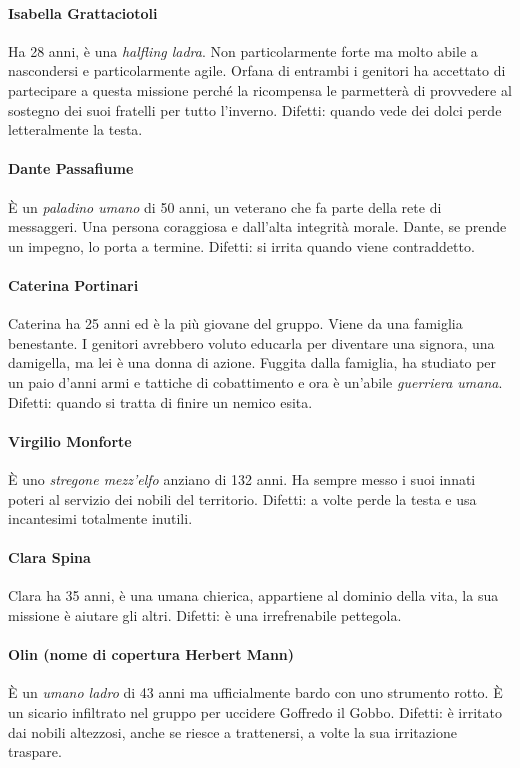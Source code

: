 \documentclass[letterpaper,twocolumn,openany,nodeprecatedcode]{dndbook}
\begin{document}
\paragraph{Isabella Grattaciotoli} Ha 28 anni, è una \textit{halfling ladra}. Non particolarmente forte ma molto abile a nascondersi e particolarmente agile. Orfana di entrambi i genitori ha accettato di partecipare a questa missione perché la ricompensa le parmetterà di provvedere al sostegno dei suoi fratelli per tutto l'inverno. Difetti: quando vede dei dolci perde letteralmente la testa.

\paragraph{Dante Passafiume} È un \textit{paladino umano} di 50 anni, un veterano che fa parte della rete di messaggeri. Una persona coraggiosa e dall'alta integrità morale. Dante, se prende un impegno, lo porta a termine. Difetti: si irrita quando viene contraddetto.

\paragraph{Caterina Portinari} Caterina ha 25 anni ed è la più giovane del gruppo. Viene da una famiglia benestante. I genitori avrebbero voluto educarla per diventare una signora, una damigella, ma lei è una donna di azione. Fuggita dalla famiglia, ha studiato per un paio d'anni armi e tattiche di cobattimento e ora è un'abile \textit{guerriera umana}. Difetti: quando si tratta di finire un nemico esita.

\paragraph{Virgilio Monforte} È uno \textit{stregone mezz'elfo} anziano di 132 anni. Ha sempre messo i suoi innati poteri al servizio dei nobili del territorio. Difetti: a volte perde la testa e usa incantesimi totalmente inutili.

\paragraph{Clara Spina} Clara ha 35 anni, è una umana chierica, appartiene al dominio della vita, la sua missione è aiutare gli altri. Difetti: è una irrefrenabile pettegola.

\paragraph{Olin (nome di copertura Herbert Mann)} È un \textit{umano ladro} di 43 anni ma ufficialmente bardo con uno strumento rotto. È un sicario infiltrato nel gruppo per uccidere Goffredo il Gobbo. Difetti: è irritato dai nobili altezzosi, anche se riesce a trattenersi, a volte la sua irritazione traspare.
\end{document}
